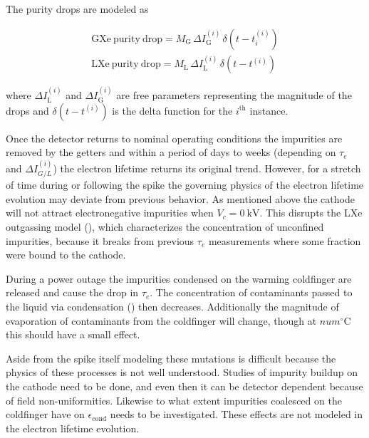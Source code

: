 The purity drops are modeled as

\begin{subequations}
\begin{align}
\mathrm{GXe\ purity\ drop} = M_{\mathrm{G}}\, \Delta I_{\mathrm{G}}^{(i)}\, \delta (t - t_i^{(i)})
\\
\mathrm{LXe\ purity\ drop} = M_{\mathrm{L}}\, \Delta I_{\mathrm{L}}^{(i)}\, \delta (t - t^{(i)})
\end{align}
\end{subequations}

\noindent where $\Delta I_{\mathrm{L}}^{(i)}$ and $\Delta I_{\mathrm{G}}^{(i)}$ are free parameters representing the magnitude of the drops and
$\delta (t - t^{(i)})$ is the delta function for the $i^{\mathrm{th}}$ instance.

Once the detector returns to nominal operating conditions the impurities are removed by the getters and within a period of days to weeks
(depending on $\tau_e$ and $\Delta I_{G/L}^{(i)}$) the electron lifetime returns its original trend.  However, for a stretch of time during
or following the spike the governing physics of the electron lifetime evolution may deviate from previous behavior.  As mentioned above
the
cathode will not attract electronegative impurities when $V_c = 0\ \mathrm{kV}$.  This disrupts the LXe outgassing model
(), which
characterizes the concentration of unconfined impurities, because it breaks from previous $\tau_e$ measurements where some fraction were
bound to the cathode.

During a power outage the impurities condensed on the warming
coldfinger are released and cause the drop in $\tau_e$.  The concentration of contaminants passed to the liquid via condensation
() then decreases.  Additionally the magnitude of evaporation of contaminants from
the coldfinger will change, though at $num^{\circ} \mathrm{C}$ this should have a small effect.

Aside from the spike itself modeling these mutations is difficult because the physics of these processes is not well understood.  Studies
of impurity buildup on the cathode need to be done, and even then it can be detector dependent because of field
non-uniformities.  Likewise to what extent impurities coalesced on the coldfinger have on $\epsilon_{\mathrm{cond}}$ needs to be
investigated.  These effects are not modeled in the electron lifetime evolution.



